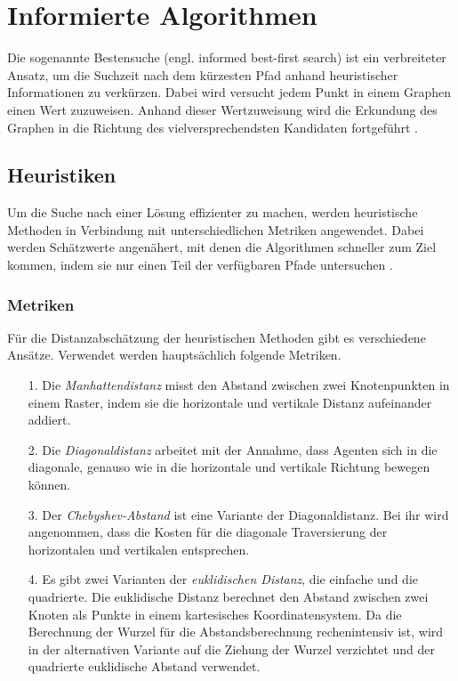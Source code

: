 \section{Informierte Algorithmen}

Die sogenannte Bestensuche (engl. informed best-first search)
ist ein verbreiteter Ansatz, um die Suchzeit nach dem kürzesten Pfad anhand heuristischer Informationen zu verkürzen. Dabei wird versucht jedem Punkt in einem Graphen einen Wert zuzuweisen. Anhand dieser Wertzuweisung wird die Erkundung des Graphen in die Richtung des vielversprechendsten Kandidaten fortgeführt \cite{RinaDechterandJudeaPearl.1983}.

\subsection{Heuristiken}
Um die Suche nach einer Lösung effizienter zu machen, werden heuristische Methoden in Verbindung mit unterschiedlichen Metriken %
angewendet. Dabei werden Schätzwerte angenähert, mit denen die Algorithmen schneller zum Ziel kommen, indem sie nur einen Teil der verfügbaren Pfade untersuchen \cite{RinaDechterandJudeaPearl.1983}.

\subsubsection{Metriken}
Für die Distanzabschätzung der heuristischen Methoden gibt es verschiedene Ansätze. Verwendet werden hauptsächlich folgende Metriken.

\begin{itemize}
\item[1.] Die \textit{Manhattendistanz} misst den Abstand zwischen zwei Knotenpunkten in einem Raster, indem sie die horizontale und vertikale Distanz aufeinander addiert.

\item[2.] Die \textit{Diagonaldistanz} arbeitet mit der Annahme, dass Agenten sich in die diagonale, genauso wie in die horizontale und vertikale Richtung bewegen können.

\item[3.] Der \textit{Chebyshev-Abstand} ist eine Variante der Diagonaldistanz. Bei ihr wird angenommen, dass die Kosten für die diagonale Traversierung der horizontalen und vertikalen entsprechen.

\item[4.] Es gibt zwei Varianten der \textit{euklidischen Distanz}, die einfache und die quadrierte. Die euklidische Distanz berechnet den Abstand zwischen zwei Knoten als Punkte in einem kartesisches Koordinatensystem. Da die Berechnung der Wurzel für die Abstandsberechnung rechenintensiv ist, wird in der alternativen Variante auf die Ziehung der Wurzel verzichtet und der quadrierte euklidische Abstand verwendet\cite{You19}.

\end{itemize}
